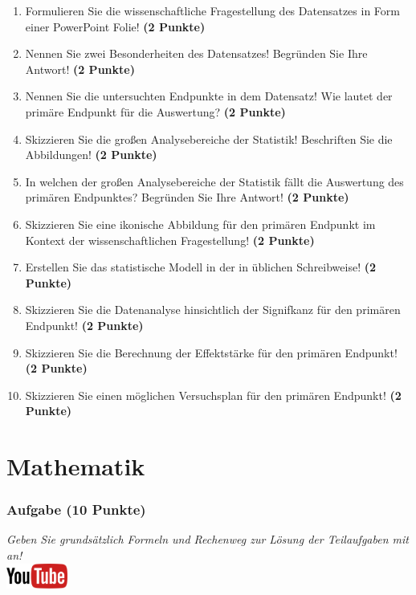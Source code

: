 \documentclass[a4paper, 9pt]{scrartcl}\usepackage[]{graphicx}\usepackage[]{xcolor}
\begin{document}
\begin{enumerate}
  \setcounter{enumi}{0}
  \item Formulieren Sie die wissenschaftliche Fragestellung des Datensatzes in Form einer PowerPoint Folie! \textbf{(2 Punkte)}
  \item Nennen Sie zwei Besonderheiten des Datensatzes! Begründen Sie Ihre Antwort! \textbf{(2 Punkte)}
  \item Nennen Sie die untersuchten Endpunkte in dem Datensatz! Wie lautet der primäre Endpunkt für die Auswertung? \textbf{(2 Punkte)}
  \item Skizzieren Sie die großen Analysebereiche der Statistik! Beschriften Sie die Abbildungen! \textbf{(2 Punkte)}
  \item In welchen der großen Analysebereiche der Statistik fällt die Auswertung des primären Endpunktes? Begründen Sie Ihre Antwort! \textbf{(2 Punkte)}
  \item Skizzieren Sie eine ikonische Abbildung für den primären Endpunkt im Kontext der wissenschaftlichen Fragestellung! \textbf{(2 Punkte)}
  \item Erstellen Sie das statistische Modell in der in \Rlogo üblichen Schreibweise! \textbf{(2 Punkte)}
  \item Skizzieren Sie die Datenanalyse hinsichtlich der Signifkanz für den primären Endpunkt! \textbf{(2 Punkte)}
  \item Skizzieren Sie die Berechnung der Effektstärke für den primären Endpunkt! \textbf{(2 Punkte)}
  \item Skizzieren Sie einen möglichen Versuchsplan für den primären Endpunkt! \textbf{(2 Punkte)}
\end{enumerate} 
\clearpage
\part{Mathematik}

\section{Aufgabe \hfill (10 Punkte)}

\textit{Geben Sie grunds{\"a}tzlich Formeln und Rechenweg zur L{\"o}sung der
  Teilaufgaben mit an!} \\[1Ex]

\hfill\href{https://youtu.be/Fu8kN0Uj13Y}{\includegraphics[width =
  2cm]{img/youtube}} %
\hspace{2Ex}
\end{document}
